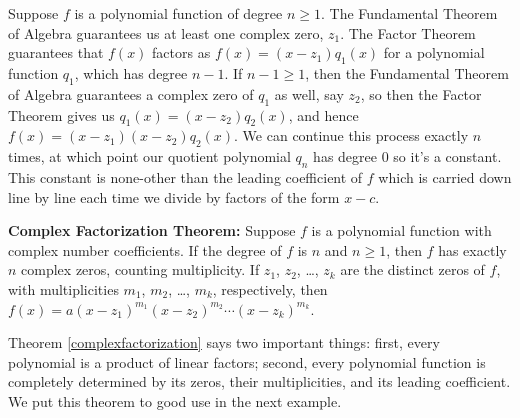 \documentclass{ximera}
\begin{document}
Suppose  $f$ is a polynomial function of degree $n \geq 1$.  The Fundamental Theorem of Algebra guarantees us at least one complex zero, $z_1$.  The Factor Theorem guarantees that $f(x)$ factors as $f(x) = \left(x - z_1\right) q_1(x)$ for a polynomial function $q_1$,  which has degree $n-1$.  If $n-1 \geq 1$, then the Fundamental Theorem of Algebra guarantees a complex zero of $q_1$ as well, say $z_2$, so then the Factor Theorem gives us $q_1(x) = \left(x - z_2\right) q_2(x)$, and hence $f(x) = \left(x - z_1\right) \left(x - z_2\right) q_2(x)$.  We can continue this process exactly $n$ times, at which point our quotient polynomial $q_n$ has degree $0$ so it's a constant.  This constant is none-other than the leading coefficient of $f$ which is carried down line by line each time we divide by factors of the form $x-c$.


\begin{theorem} \label{complexfactorization} \textbf{Complex Factorization Theorem:} Suppose $f$ is a polynomial function with complex number coefficients.  If the degree of $f$ is $n$ and $n \geq 1$, then  $f$ has exactly $n$ complex zeros, counting multiplicity.  If $z_1$, $z_2$, \ldots, $z_k$ are the distinct zeros of $f$, with multiplicities $m_1$, $m_2$, \ldots, $m_k$, respectively, then $f(x) = a\left(x - z_1  \right)^{m_1}\left(x - z_2  \right)^{m_2} \cdots \left(x - z_k  \right)^{m_k}$. 

\end{theorem}

 

Theorem \ref{complexfactorization} says two important things:  first, every polynomial is a product of linear factors;  second, every polynomial function is completely determined by its zeros, their multiplicities, and its leading coefficient.  We put this theorem to good use in the next example.
\end{document}

